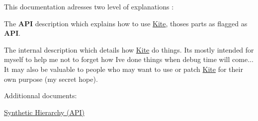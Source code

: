 This documentation adresses two level of explanations \+:


\begin{DoxyItemize}
\item The {\bfseries A\+PI} description which explains how to use \hyperlink{namespaceKite}{Kite}, thoses parts as flagged as {\bfseries A\+PI}. 
\item The internal description which details how \hyperlink{namespaceKite}{Kite} do things. It\textquotesingle{}s mostly intended for myself to help me not to forget how I\textquotesingle{}ve done things when debug time will come... It may also be valuable to people who may want to use or patch \hyperlink{namespaceKite}{Kite} for their own purpose (my secret hope). 
\end{DoxyItemize}

Additionnal documents\+:
\begin{DoxyItemize}
\item \hyperlink{group__grpSynthHierarchy}{Synthetic Hierarchy (A\+PI)} 
\end{DoxyItemize}